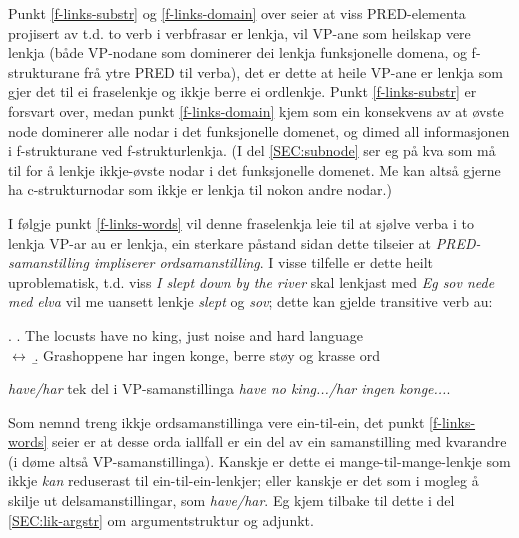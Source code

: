 \documentclass[11pt,a4paper,oneside,draft]{book}
\begin{document}
Punkt \ref{f-links-substr} og \ref{f-links-domain} over seier at viss
PRED-elementa projisert av t.d. to verb i verbfrasar er lenkja, vil
VP-ane som heilskap vere lenkja (både VP-nodane som dominerer dei
lenkja funksjonelle domena, og f-strukturane frå ytre PRED til verba),
det er dette at heile VP-ane er lenkja som gjer det til ei fraselenkje
og ikkje berre ei ordlenkje. Punkt \ref{f-links-substr} er forsvart
over, medan punkt \ref{f-links-domain} kjem som ein konsekvens av at
øvste node dominerer alle nodar i det funksjonelle domenet, og dimed
all informasjonen i f-strukturane ved f-strukturlenkja.  (I del
\ref{SEC:subnode} ser eg på kva som må til for å lenkje ikkje-øvste
nodar i det funksjonelle domenet.  Me kan altså gjerne ha
c-strukturnodar som ikkje er lenkja til nokon andre nodar.)

I følgje punkt \ref{f-links-words} vil denne fraselenkja leie til at
sjølve verba i to lenkja VP-ar au er lenkja, ein sterkare påstand
sidan dette tilseier at \emph{PRED-samanstilling impliserer ordsamanstilling}. I visse tilfelle er dette heilt uproblematisk,
t.d. viss \emph{I slept down by the river} skal lenkjast med \emph{Eg sov nede med elva} vil me uansett lenkje \emph{slept} og \emph{sov}; dette kan gjelde
transitive verb au:

\ex. \a. The locusts have no king, just noise and hard language\\
     $\leftrightarrow$
     \b. Grashoppene har ingen konge, berre støy og krasse ord



\emph{have/har} tek del i VP-samanstillinga \emph{have no king.../har ingen konge...}.

Som nemnd treng ikkje ordsamanstillinga vere ein-til-ein, det
punkt \ref{f-links-words} seier er at desse orda iallfall er ein del
av ein samanstilling med kvarandre (i døme \Last altså
VP-samanstillinga). Kanskje er dette ei mange-til-mange-lenkje som
ikkje \emph{kan} reduserast til ein-til-ein-lenkjer; eller kanskje er
det som i \Last mogleg å skilje ut delsamanstillingar, som
\emph{have/har}. Eg kjem tilbake til dette i del \ref{SEC:lik-argstr} om
argumentstruktur og adjunkt. 

\end{document}
